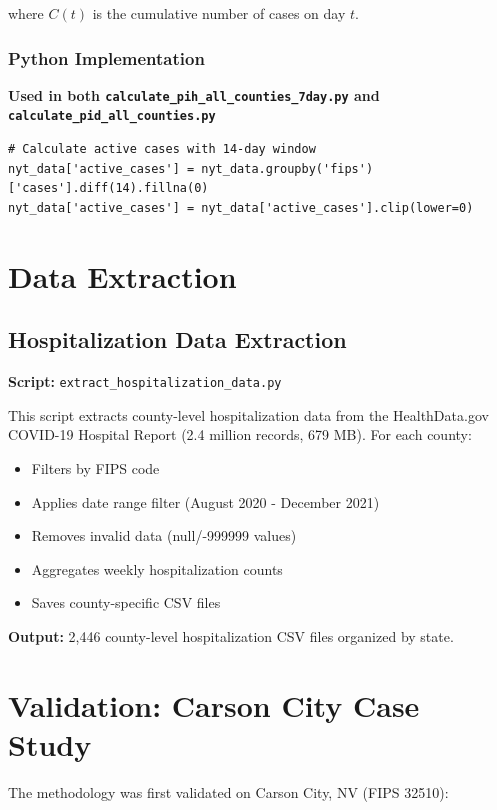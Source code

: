 \documentclass[11pt]{article}
\begin{document}
where $C(t)$ is the cumulative number of cases on day $t$.

\subsubsection{Python Implementation}
\textbf{Used in both \texttt{calculate\_pih\_all\_counties\_7day.py} and \texttt{calculate\_pid\_all\_counties.py}}

\begin{lstlisting}
# Calculate active cases with 14-day window
nyt_data['active_cases'] = nyt_data.groupby('fips')['cases'].diff(14).fillna(0)
nyt_data['active_cases'] = nyt_data['active_cases'].clip(lower=0)
\end{lstlisting}

\section{Data Extraction}

\subsection{Hospitalization Data Extraction}

\textbf{Script:} \texttt{extract\_hospitalization\_data.py}

This script extracts county-level hospitalization data from the HealthData.gov COVID-19 Hospital Report (2.4 million records, 679 MB). For each county:

\begin{itemize}
    \item Filters by FIPS code
    \item Applies date range filter (August 2020 - December 2021)
    \item Removes invalid data (null/-999999 values)
    \item Aggregates weekly hospitalization counts
    \item Saves county-specific CSV files
\end{itemize}

\textbf{Output:} 2,446 county-level hospitalization CSV files organized by state.

\section{Validation: Carson City Case Study}

The methodology was first validated on Carson City, NV (FIPS 32510):
\end{document}
